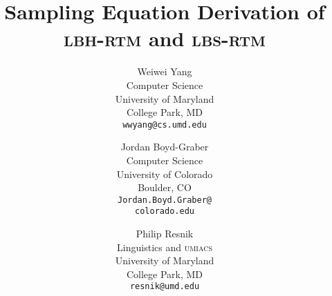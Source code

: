 \documentclass[11pt,a4paper]{article}
\title{Sampling Equation Derivation of \textsc{lbh-rtm} and \textsc{lbs-rtm}}
\author{Weiwei Yang\\
  Computer Science \\
  University of Maryland \\
  College Park, MD \\
  {\tt wwyang@cs.umd.edu} \\\and
  Jordan Boyd-Graber \\
  Computer Science \\
  University of Colorado \\
  Boulder, CO \\
  {\tt Jordan.Boyd.Graber@} \\
  {\tt colorado.edu}\\\and
  Philip Resnik \\
  Linguistics and \textsc{umiacs} \\
  University of Maryland \\
  College Park, MD \\
  {\tt resnik@umd.edu} \\
}
\date{}
\newcommand{\sectfile}[1]{}
\begin{document}
\maketitle

\sectfile{01Block}

\sectfile{02Topic} \clearpage

\sectfile{03Optimization}

\sectfile{04Sampling}



\end{document}
